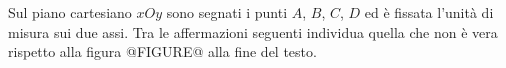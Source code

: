 Sul piano cartesiano \({xOy}\) sono segnati i punti \(A\), \(B\), \(C\), \(D\) ed è fissata l’unità di
misura sui due assi. Tra le affermazioni seguenti individua quella che non è vera rispetto alla figura 
@FIGURE@ alla fine del testo. 
